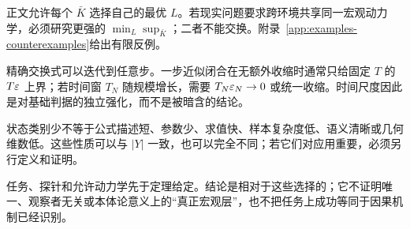 正文允许每个 $\bar K$ 选择自己的最优 $L$。若现实问题要求跨环境共享同一宏观动力学，必须研究更强的 $\min_L\sup_{\bar K}$；二者不能交换。附录~\ref{app:examples-counterexamples}给出有限反例。

精确交换式可以迭代到任意步。一步近似闭合在无额外收缩时通常只给固定 $T$ 的 $T\varepsilon$ 上界；若时间窗 $T_N$ 随规模增长，需要 $T_N\varepsilon_N\to0$ 或统一收缩。时间尺度因此是对基础判据的独立强化，而不是被暗含的结论。

状态类别少不等于公式描述短、参数少、求值快、样本复杂度低、语义清晰或几何维数低。这些性质可以与 $|Y|$ 一致，也可以完全不同；若它们对应用重要，必须另行定义和证明。

任务、探针和允许动力学先于定理给定。结论是相对于这些选择的；它不证明唯一、观察者无关或本体论意义上的“真正宏观层”，也不把任务上成功等同于因果机制已经识别。
